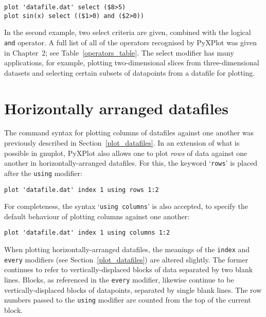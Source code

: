 \begin{verbatim}
plot 'datafile.dat' select ($8>5)
plot sin(x) select (($1>0) and ($2>0))
\end{verbatim}

In the second example, two select criteria are given, combined with the logical
{\tt and} operator. A full list of all of the operators recognised by PyXPlot
was given in Chapter~2; see Table~\ref{operators_table}.  The select modifier
has many applications, for example, plotting two-dimensional slices from
three-dimensional datasets and selecting certain subsets of datapoints from a
datafile for plotting.

\section{Horizontally arranged datafiles}

\label{horizontal_datafiles} The
command syntax for plotting columns of datafiles against one another was
previously described in Section~\ref{plot_datafiles}.  In an extension of what
is possible in gnuplot, PyXPlot also allows one to plot \textit{rows} of data
against one another in horizontally-arranged datafiles.  For this, the keyword
`{\tt rows}' is placed after the {\tt using} modifier:

\begin{verbatim}
plot 'datafile.dat' index 1 using rows 1:2
\end{verbatim}

\noindent For completeness, the syntax `{\tt using columns}' is also
accepted, to specify the default behaviour of plotting columns against one
another:

\begin{verbatim}
plot 'datafile.dat' index 1 using columns 1:2
\end{verbatim}

When plotting horizontally-arranged datafiles, the meanings of the
{\tt index} and {\tt every} modifiers (see Section~\ref{plot_datafiles})
are altered slightly. The former continues to refer to vertically-displaced
blocks of data separated by two blank lines.  Blocks, as referenced in the
{\tt every} modifier, likewise continue to be vertically-displaced blocks of
datapoints, separated by single blank lines. The row numbers passed to the
{\tt using} modifier are counted from the top of the current block.

